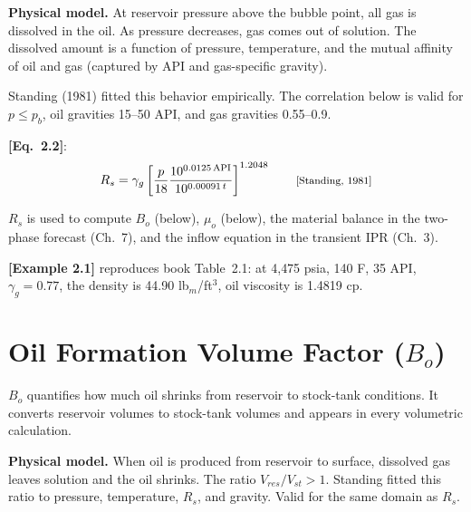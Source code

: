 \documentclass[11pt,a4paper,openany]{book}
\newcommand{\eqtag}[1]{\tag*{\textnormal{\footnotesize[#1]}}}
\newcommand{\eqrefbook}[1]{\textcolor{blue!60!black}{\textbf{[Eq.~#1]}}}
\newcommand{\exref}[1]{\textcolor{purple!70!black}{\textbf{[#1]}}}
\begin{document}
\begin{theory}
\textbf{Physical model.} At reservoir pressure above the bubble
point, all gas is dissolved in the oil. As pressure decreases, gas
comes out of solution. The dissolved amount is a function of pressure,
temperature, and the mutual affinity of oil and gas (captured by API
and gas-specific gravity).

Standing (1981) fitted this behavior empirically. The correlation
below is valid for $p \le p_b$, oil gravities 15--50 \textdegree API,
and gas gravities 0.55--0.9.
\end{theory}

\eqrefbook{2.2}:
\begin{equation}
  R_s = \gamma_g \left[
    \frac{p}{18}
    \frac{10^{0.0125\,\mathrm{API}}}{10^{0.00091\,t}}
  \right]^{1.2048}
  \eqtag{Standing, 1981}
\end{equation}

\begin{application}
$R_s$ is used to compute $B_o$ (below), $\mu_o$ (below), the
material balance in the two-phase forecast (Ch.~7), and the inflow
equation in the transient IPR (Ch.~3).
\end{application}

\begin{valbox}
\exref{Example 2.1} reproduces book Table~2.1: at 4{,}475 psia,
140 \textdegree F, 35 \textdegree API, $\gamma_g = 0.77$, the density
is 44.90 lb$_m$/ft$^3$, oil viscosity is 1.4819 cp.
\end{valbox}

\section{Oil Formation Volume Factor ($B_o$)}

\begin{purpose}
$B_o$ quantifies how much oil shrinks from reservoir to stock-tank
conditions. It converts reservoir volumes to stock-tank volumes and
appears in every volumetric calculation.
\end{purpose}

\begin{theory}
\textbf{Physical model.} When oil is produced from reservoir to
surface, dissolved gas leaves solution and the oil shrinks. The ratio
$V_{res}/V_{st} > 1$. Standing fitted this ratio to pressure,
temperature, $R_s$, and gravity. Valid for the same domain as $R_s$.
\end{theory}
\end{document}
